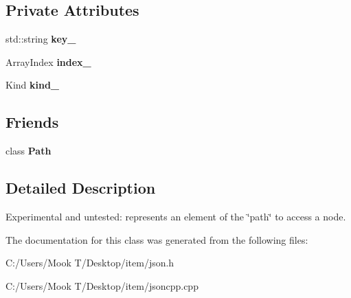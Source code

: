 \subsection*{Private Attributes}
\begin{DoxyCompactItemize}
\item 
\hypertarget{class_json_1_1_path_argument_a5d901b404323b61f066fb1adb3babfe1}{}std\+::string {\bfseries key\+\_\+}\label{class_json_1_1_path_argument_a5d901b404323b61f066fb1adb3babfe1}

\item 
\hypertarget{class_json_1_1_path_argument_afd5857d1b6bfaae6961333bdae7bd5ec}{}Array\+Index {\bfseries index\+\_\+}\label{class_json_1_1_path_argument_afd5857d1b6bfaae6961333bdae7bd5ec}

\item 
\hypertarget{class_json_1_1_path_argument_ad4bc4b544b155a3d9c7788572ecf991b}{}Kind {\bfseries kind\+\_\+}\label{class_json_1_1_path_argument_ad4bc4b544b155a3d9c7788572ecf991b}

\end{DoxyCompactItemize}
\subsection*{Friends}
\begin{DoxyCompactItemize}
\item 
\hypertarget{class_json_1_1_path_argument_a4877239a6b7f09fbf5a61ca68a49d74c}{}class {\bfseries Path}\label{class_json_1_1_path_argument_a4877239a6b7f09fbf5a61ca68a49d74c}

\end{DoxyCompactItemize}


\subsection{Detailed Description}
Experimental and untested\+: represents an element of the \char`\"{}path\char`\"{} to access a node. 

The documentation for this class was generated from the following files\+:\begin{DoxyCompactItemize}
\item 
C\+:/\+Users/\+Mook T/\+Desktop/item/json.\+h\item 
C\+:/\+Users/\+Mook T/\+Desktop/item/jsoncpp.\+cpp\end{DoxyCompactItemize}
